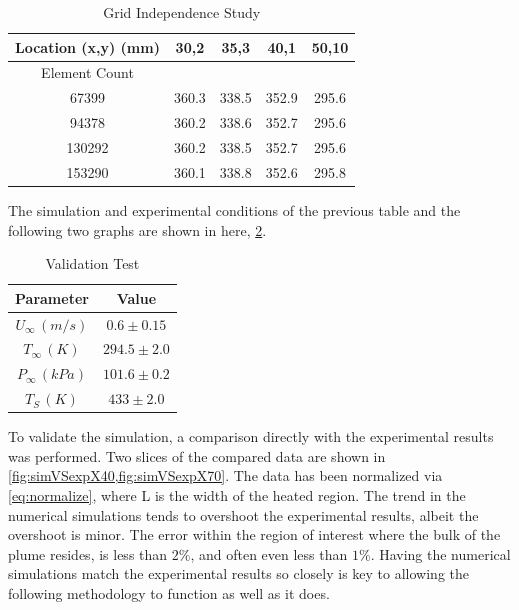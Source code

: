 \documentclass[preprint,12pt]{elsarticle}
\begin{document}
\begin{table}[!h!t!b!p]
\begin{center}
\begin{tabular}{ c c c c c }
 Location (x,y) (mm) & 30,2 & 35,3 & 40,1 & 50,10 \\ \hline \hline
 Element Count & \\ \hline
 67399  & 360.3 & 338.5 & 352.9 & 295.6 \\ \hline
 94378  & 360.2 & 338.6 & 352.7 & 295.6 \\ \hline
 130292 & 360.2 & 338.5 & 352.7 & 295.6 \\ \hline
 153290 & 360.1 & 338.8 & 352.6 & 295.8 \\ \hline
\end{tabular}
\caption{Grid Independence Study \cite{cht12}}
\label{tab:grid}
\end{center}
\end{table}
%
The simulation and experimental conditions of the previous table and the following two graphs are shown in here, \cref{tab:VT}.

\begin{table}[!h!t!b!p]
\begin{center}
\begin{tabular}{ c c }
Parameter    & Value \\ \hline
$U_{\infty} \, (m/s)$ & $0.6\pm0.15$ \\
$T_{\infty} \, (K) $ & $294.5\pm2.0$ \\
$P_{\infty} \, (kPa) $ & $101.6\pm0.2$ \\
$T_{S} \, (K) $ & $433\pm2.0$ \\
\end{tabular}
\caption{Validation Test \cite{cht12}}
\label{tab:VT}
\end{center}
\end{table}

To validate the simulation, a comparison directly with the experimental results was performed.  Two slices of the compared data are shown in \cref{fig:simVSexpX40,fig:simVSexpX70}.  The data has been normalized via \cref{eq:normalize}, where L is the width of the heated region.  The trend in the numerical simulations tends to overshoot the experimental results, albeit the overshoot is minor.  The error within the region of interest where the bulk of the plume resides, is less than $2\%$, and often even less than $1\%$.  Having the numerical simulations match the experimental results so closely is key to allowing the following methodology to function as well as it does.
\end{document}
